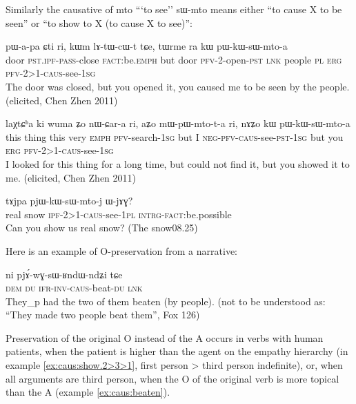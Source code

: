 \documentclass[oldfontcommands,oneside,a4paper,11pt]{article}
\newcommand{\ipa}[1]{{\phon \mbox{#1}}} %
\newcommand{\sg}{\textsc{sg}}
\newcommand{\pl}{\textsc{pl}}
\newcommand{\wav}[1]{}%
\newcommand{\pfv}{\textsc{pfv}}
\newcommand{\caus}{\textsc{caus}}
\newcommand{\lnk}{\textsc{lnk}}
\newcommand{\dem}{\textsc{dem}}
\newcommand{\du}{\textsc{du}}
\newcommand{\erg}{\textsc{erg}}
\newcommand{\emphat}{\textsc{emph}}
\newcommand{\evd}{\textsc{ifr}}
\newcommand{\intrg}{\textsc{intrg}}
\newcommand{\inv}{\textsc{inv}}
\newcommand{\ipf}{\textsc{ipf}}
\newcommand{\negat}{\textsc{neg}}
\newcommand{\fact}{\textsc{fact}}
\newcommand{\pass}{\textsc{pass}}
\newcommand{\pst}{\textsc{pst}}
\begin{document}
Similarly the causative of \ipa{mto} ```to see'' \ipa{sɯ-mto} means either ``to cause X to be seen'' or ``to show to X (to cause X to see)'':

\begin{exe} 
\ex \label{ex:caus:show.2>3>1}
\gll  \ipa{kɯm} 	\ipa{pɯ-a-pa} 	\ipa{ɕti} 	\ipa{ri,} 	\ipa{kɯm} 	\ipa{lɤ-tɯ-cɯ-t} 	\ipa{tɕe,} 	\ipa{tɯrme} 	\ipa{ra} 	\ipa{kɯ} 	\ipa{pɯ-kɯ-sɯ-mto-a}  \\
door \pst{}.\ipf{}-\pass{}-close \fact{}:be.\emphat{} but door \pfv{}-2-open-\pst{} \lnk{} people \pl{} \erg{}  \pfv{}-2>1-\caus{}-see-1\sg{}  \\
 \glt The door was closed, but you opened it, you caused me to be seen by the people. (elicited, Chen Zhen 2011) \wav{8_pWkWsWmtoa} 
\end{exe} 


\begin{exe}
\ex
\gll \ipa{kɯki} 	\ipa{laχtɕʰa} 	\ipa{ki} 	\ipa{wuma} 	\ipa{ʑo} 	\ipa{nɯ-ɕar-a} 	\ipa{ri,} 	\ipa{aʑo} 	\ipa{mɯ-pɯ-mto-t-a} 	\ipa{ri,} 	\ipa{nɤʑo} 	\ipa{kɯ} 	\ipa{pɯ-kɯ-sɯ-mto-a}   \\
this thing this very \emphat{} \pfv{}-search-1\sg{} but I \negat{}-\pfv{}-\caus{}-see-\pst{}-1\sg{} but you \erg{}  \pfv{}-2>1-\caus{}-see-1\sg{} \\
 \glt I looked for this thing for a long time, but could not find it, but you showed it to me. (elicited, Chen Zhen 2011)
\end{exe} 

\begin{exe}
\ex
\gll   \ipa{koŋla} 	\ipa{tɤjpa} 	\ipa{pjɯ-kɯ-sɯ-mto-j} 	\ipa{ɯ-jɤɣ?}   \\
real snow \ipf{}-2>1-\caus{}-see-1\pl{} \intrg{}-\fact{}:be.possible  \\
 \glt Can you show us real snow? (The snow08.25)
\end{exe} 


Here is an example of O-preservation from a narrative:
\begin{exe} 
\ex \label{ex:caus:beaten}
\gll  \ipa{nɯnɯ} 	\ipa{ni} 	\ipa{pjɤ́-wɣ-sɯ-ʁndɯ-ndʑi} 	\ipa{tɕe}  \\
\dem{} \du{} \evd{}-\inv{}-\caus{}-beat-\du{} \lnk{} \\
\glt They_p had the two of them beaten (by people). (not to be understood as: ``They made two people beat them'', Fox 126)
\end{exe} 
Preservation of the original O   instead of the A occurs in verbs with  human patients, when the patient is higher than the agent on the empathy hierarchy (in example \ref{ex:caus:show.2>3>1}, first person > third person indefinite), or, when all arguments are third person, when the O of the original verb is more topical than the A (example \ref{ex:caus:beaten}).
\end{document}
